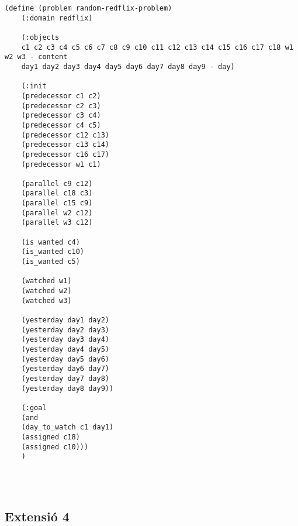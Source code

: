 \documentclass[a4paper]{article}
\begin{document}
		\begin{lstlisting}[language=PDDL, caption={Joc de Prova Random - Extensió 3}, label={lst:JPR3}]                  
	(define (problem random-redflix-problem)
	(:domain redflix)
	
	(:objects
	c1 c2 c3 c4 c5 c6 c7 c8 c9 c10 c11 c12 c13 c14 c15 c16 c17 c18 w1 w2 w3 - content
	day1 day2 day3 day4 day5 day6 day7 day8 day9 - day)
	
	(:init
	(predecessor c1 c2)
	(predecessor c2 c3)
	(predecessor c3 c4)
	(predecessor c4 c5)
	(predecessor c12 c13)
	(predecessor c13 c14)
	(predecessor c16 c17)
	(predecessor w1 c1)
	
	(parallel c9 c12)
	(parallel c18 c3)
	(parallel c15 c9)
	(parallel w2 c12)
	(parallel w3 c12)
	
	(is_wanted c4)
	(is_wanted c10)
	(is_wanted c5)
	
	(watched w1)
	(watched w2)
	(watched w3)
	
	(yesterday day1 day2)
	(yesterday day2 day3)
	(yesterday day3 day4)
	(yesterday day4 day5)
	(yesterday day5 day6)
	(yesterday day6 day7)
	(yesterday day7 day8)
	(yesterday day8 day9))
	
	(:goal
	(and
	(day_to_watch c1 day1)
	(assigned c18)
	(assigned c10)))
	)
	  
		
		
	\end{lstlisting}
	
	\subsection{Extensió 4}
\end{document}
